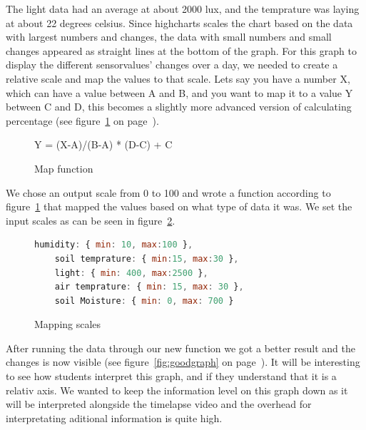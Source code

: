 The light data had an average at about 2000 lux, and the temprature was laying at about 22 degrees celsius. Since highcharts scales the chart based on the data with largest numbers and changes, the data with small numbers and small changes appeared as straight lines at the bottom of the graph. 
For this graph to display the different sensorvalues’ changes over a day, we needed to create a relative scale and map the values to that scale. Lets say you have a number X, which can have a value between A and B, and you want to map it to a value Y between C and D, this becomes a slightly more advanced version of calculating percentage (see figure~\ref{fig:mapfunc} on page~\pageref{fig:mapfunc}).

\begin{figure}
\centering
Y = (X-A)/(B-A) * (D-C) + C
\caption{Map function}
\label{fig:mapfunc}
\end{figure}

We chose an output scale from 0 to 100 and wrote a function according to figure~\ref{fig:mapfunc} that mapped the values based on what type of data it was. We set the input scales as can be seen in figure~\ref{fig:mapscale}.

\begin{figure}
	\begin{lstlisting}[language=javascript]
	humidity: { min: 10, max:100 },
	soil temprature: { min:15, max:30 },
	light: { min: 400, max:2500 },
	air temprature: { min: 15, max: 30 },
	soil Moisture: { min: 0, max: 700 }
	\end{lstlisting}
	\caption{Mapping scales}
	\label{fig:mapscale}
\end{figure}

After running the data through our new function we got a better result and the changes is now visible (see figure~\ref{fig:goodgraph} on page~\pageref{fig:goodgraph}). It will be interesting to see how students interpret this graph, and if they understand that it is a relativ axis. We wanted to keep the information level on this graph down as it will be interpreted alongside the timelapse video and the overhead for interpretating aditional information is quite high.  

